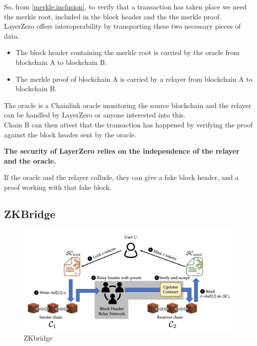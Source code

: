 So, from \ref{merkle:inclusion},  to verify that a transaction has taken place we need the merkle root, included in the block header and the the merkle proof. 
\\
LayerZero offers interoperability by transporting these two necessary pieces of data.
\begin{itemize}
    \item The block header containing the merkle root is carried by the oracle from blockchain A to blockchain B. 
    \item The merkle proof of blockchain A is carried by a relayer from blockchain A to blockchain B.
\end{itemize}

The oracle is a Chainlink oracle monitoring the source blockchain and the relayer can be handled by LayerZero or anyone interested into this. 
\\
Chain B can then attest that the transaction has happened by verifying the proof against the block header sent by the oracle.

\textbf{The security of LayerZero relies on the independence of the relayer and the oracle.}

If the oracle and the relayer collude, they can give a fake block header, and a proof working with that fake block. 


\subsection{ZKBridge}
\begin{figure}[H]
    \centering
\includegraphics[width=0.8\linewidth]{interoperability/zkbridge.png}
    \caption{ZKbridge}
    \label{fig:zkbridge}
\end{figure}

